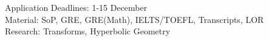 \noindent Application Deadlines: 1-15 December\\
\noindent Material: SoP, GRE, GRE(Math), IELTS/TOEFL, Transcripts, LOR\\
\noindent Research: Transforms, Hyperbolic Geometry
